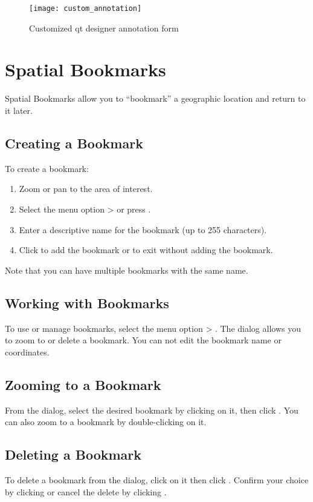 \begin{figure}[ht]
   \centering
   \texttt{[image: custom\_annotation]}
   \caption{Customized qt designer annotation form \nixcaption}
   \label{fig:custom-annotations}
\end{figure}

\section{Spatial Bookmarks}\label{sec:bookmarks}

Spatial Bookmarks allow you to ``bookmark'' a geographic location and return to it later.

\subsection{Creating a Bookmark}
To create a bookmark:
\begin{enumerate}
\item Zoom or pan to the area of interest.
\item Select the menu option  >  or press .
\item Enter a descriptive name for the bookmark (up to 255 characters).
\item Click  to add the bookmark or  to exit without adding the bookmark.
\end{enumerate}

Note that you can have multiple bookmarks with the same name.

\subsection{Working with Bookmarks}
To use or manage bookmarks, select the menu 
option  > .
The  dialog allows you to zoom to or delete a bookmark.
You can not edit the bookmark name or coordinates.

\subsection{Zooming to a Bookmark}
From the  dialog, select the desired bookmark by clicking on it, 
then click .
You can also zoom to a bookmark by double-clicking on it.

\subsection{Deleting a Bookmark}
To delete a bookmark from the  dialog, click on it then click
 .
Confirm your choice by clicking  or cancel the delete by clicking .

\FloatBarrier
